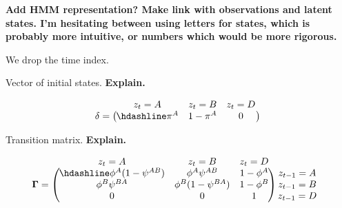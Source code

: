 \documentclass[
  12pt,
]{krantz}
\begin{document}
\textbf{Add HMM representation? Make link with observations and latent states. I'm hesitating between using letters for states, which is probably more intuitive, or numbers which would be more rigorous.}

We drop the time index.

Vector of initial states. \textbf{Explain.}

\[
\begin{matrix}
& \\
\mathbf{\delta} =
    \left ( \vphantom{ \begin{matrix} 12 \end{matrix} } \right .
\end{matrix}
\hspace{-1.2em}
\begin{matrix}
    z_t=A & z_t=B & z_t=D \\ \hdashline
\pi^A & 1 - \pi^{A} & 0\\
\end{matrix}
\hspace{-0.2em}
\begin{matrix}
& \\
\left . \vphantom{ \begin{matrix} 12 \end{matrix} } \right )
    \begin{matrix}
    \end{matrix}
\end{matrix}
\]

Transition matrix. \textbf{Explain.}

\[
\begin{matrix}
& \\
\mathbf{\Gamma} =
    \left ( \vphantom{ \begin{matrix} 12 \\ 12 \\ 12 \end{matrix} } \right .
\end{matrix}
\hspace{-1.2em}
\begin{matrix}
    z_{t}=A & z_{t}=B & z_{t}=D \\ \hdashline
\phi^A (1-\psi^{AB}) & \phi^A \psi^{AB} & 1 - \phi^A\\
\phi^B \psi^{BA} & \phi^B (1-\psi^{BA}) & 1 - \phi^B\\
0 & 0 & 1
\end{matrix}
\hspace{-0.2em}
\begin{matrix}
& \\
\left . \vphantom{ \begin{matrix} 12 \\ 12 \\ 12 \end{matrix} } \right )
    \begin{matrix}
    z_{t-1}=A \\ z_{t-1}=B \\ z_{t-1}=D
    \end{matrix}
\end{matrix}
\]
\end{document}
